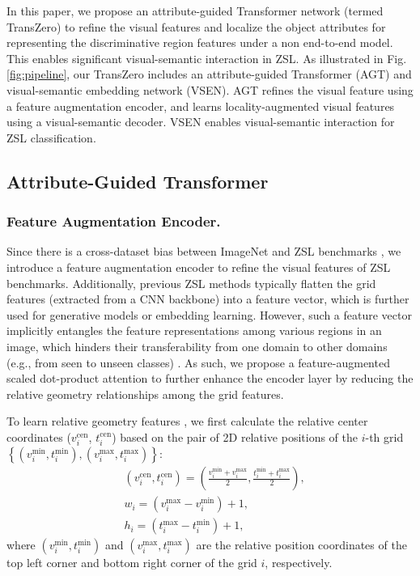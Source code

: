 \documentclass[letterpaper]{article} %
\begin{document}
	In this paper, we propose an attribute-guided Transformer network (termed TransZero) to refine the visual features and localize the object attributes for representing the discriminative region features under a non end-to-end model. This enables significant visual-semantic interaction in ZSL. As illustrated in Fig. \ref{fig:pipeline}, our TransZero includes an attribute-guided Transformer (AGT) and visual-semantic embedding network (VSEN). AGT refines the visual feature using a feature augmentation encoder, and learns locality-augmented visual features using a visual-semantic decoder. VSEN enables visual-semantic interaction for ZSL classification.
	
	
	
	\subsection{Attribute-Guided Transformer}\label{sec3.2}
	\subsubsection{Feature Augmentation Encoder.}\label{sec3.2.1}
	Since there is a cross-dataset bias between ImageNet and ZSL benchmarks \cite{Chen2021FREE}, we introduce a feature augmentation encoder to refine the visual features of ZSL benchmarks. Additionally, previous ZSL methods typically flatten the grid features (extracted from a CNN backbone) into a feature vector, which is further used for generative models or embedding learning. However, such a feature vector implicitly entangles the feature representations among various regions in an image, which hinders their transferability from one domain to other domains (e.g., from seen to unseen classes) \cite{Xu2020AttributePN,Atzmon2020ACV,Chen2021CrossDomainFE}. As such, we propose a feature-augmented scaled dot-product attention to further enhance the encoder layer by reducing the relative geometry relationships among the grid features. 
	
	To learn relative geometry features \cite{Herdade2019ImageCT,ZhangRSTNetCW}, we first calculate the relative center coordinates ($v^{\text{cen}}_i$, $t^{\text{cen}}_i$) based on the pair of 2D relative positions of the $i$-th grid $\left\{\left(v_{i}^{\min }, t_{i}^{\min }\right),\left(v_{i}^{\max }, t_{i}^{\max }\right)\right\}$:
	\begin{align}
	\label{eq:center-coor}
	&\left(v^{\text{cen}}_{i}, t^{\text{cen}}_{i}\right)=\left(\frac{v_{i}^{\min }+v_{i}^{\max }}{2}, \frac{t_{i}^{\min }+t_{i}^{\max }}{2}\right),\\
	&w_{i}=\left(v_{i}^{\max }-v_{i}^{\min }\right)+1,\\
	&h_{i}=\left(t_{i}^{\max }-t_{i}^{\min }\right)+1,
	\end{align}
	where $(v_i^{\min }, t_i^{\min })$ and $(v_i^{\max }, t_i^{\max })$ are the relative position coordinates of the top left corner and bottom right corner of the grid $i$, respectively.
	
\end{document}
